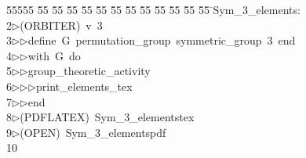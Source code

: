 %
%
\begin{tabbing}
55555 \= 55 \= 55 \= 55 \= 55 \= 55 \= 55 \= 55 \= 55 \= 55 \= 55 \= 55 \= 55 \= \>Sym\_3\_elements:\\[0pt]
2\>$\triangleright$\>(ORBITER)\ v\ 3\ \\[0pt]
3\>$\triangleright$\>$\triangleright$\>define\ G\ permutation\_group\ symmetric\_group\ 3\ end\ \\[0pt]
4\>$\triangleright$\>$\triangleright$\>with\ G\ do\ \\[0pt]
5\>$\triangleright$\>$\triangleright$\>group\_theoretic\_activity\ \\[0pt]
6\>$\triangleright$\>$\triangleright$\>$\triangleright$\>print\_elements\_tex\ \\[0pt]
7\>$\triangleright$\>$\triangleright$\>end\\[0pt]
8\>$\triangleright$\>(PDFLATEX)\ Sym\_3\_elementstex\\[0pt]
9\>$\triangleright$\>(OPEN)\ Sym\_3\_elementspdf\\[0pt]
10\>\end{tabbing}
